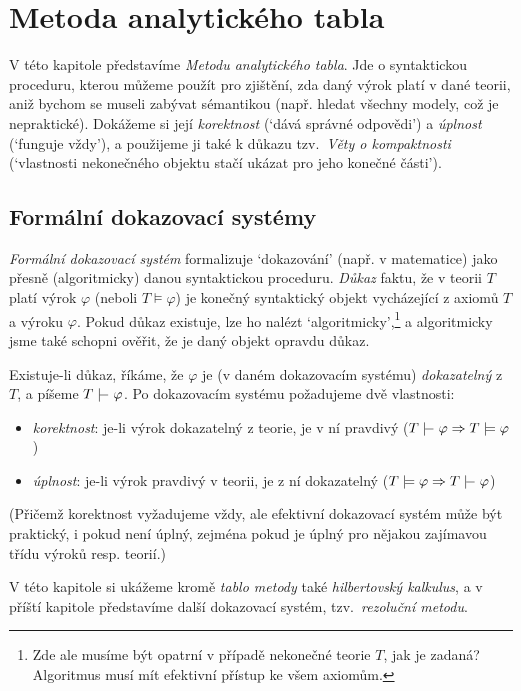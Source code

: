 \chapter{Metoda analytického tabla}
\label{chapter:tableau-method-propositional}

V této kapitole představíme \emph{Metodu analytického tabla}. Jde o syntaktickou proceduru, kterou můžeme použít pro zjištění, zda daný výrok platí v dané teorii, aniž bychom se museli zabývat sémantikou (např. hledat všechny modely, což je nepraktické). Dokážeme si její \emph{korektnost} (`dává správné odpovědi') a \emph{úplnost} (`funguje vždy'), a použijeme ji také k důkazu tzv.\ \emph{Věty o kompaktnosti} (`vlastnosti nekonečného objektu stačí ukázat pro jeho konečné části').

\section{Formální dokazovací systémy}

\emph{Formální dokazovací systém} formalizuje `dokazování' (např. v matematice) jako přesně (algoritmicky) danou syntaktickou proceduru. \emph{Důkaz} faktu, že v teorii $T$ platí výrok $\varphi$ (neboli $T\models\varphi$) je konečný syntaktický objekt vycházející z axiomů $T$ a výroku $\varphi$. Pokud důkaz existuje, lze ho nalézt `algoritmicky',\footnote{Zde ale musíme být opatrní v případě nekonečné teorie $T$, jak je zadaná? Algoritmus musí mít efektivní přístup ke všem axiomům.} a algoritmicky jsme také schopni ověřit, že je daný objekt opravdu důkaz.

Existuje-li důkaz, říkáme, že $\varphi$ je (v daném dokazovacím systému) \emph{dokazatelný} z $T$, a píšeme $T\proves\varphi$. Po dokazovacím systému požadujeme dvě vlastnosti:
\begin{itemize}
    \item \emph{korektnost}: je-li výrok dokazatelný z teorie, je v ní pravdivý ($T\proves\varphi\Rightarrow T\models\varphi$)
    \item \emph{úplnost}: je-li výrok pravdivý v teorii, je z ní dokazatelný ($T\models\varphi\Rightarrow T\proves\varphi$)
\end{itemize}
(Přičemž korektnost vyžadujeme vždy, ale efektivní dokazovací systém může být praktický, i pokud není úplný, zejména pokud je úplný pro nějakou zajímavou třídu výroků resp. teorií.)

V této kapitole si ukážeme kromě \emph{tablo metody} také \emph{hilbertovský kalkulus}, a v příští kapitole představíme další dokazovací systém, tzv.\ \emph{rezoluční metodu}.


